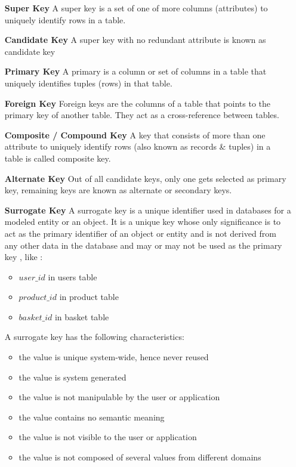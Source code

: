 \documentclass[10pt]{article}
\begin{document}
\begin{itemize}
	\item [\textbf{Super Key}] A super key is a set of one of more columns (attributes) to uniquely identify rows in a table.
	\item [\textbf{Candidate Key}] A super key with no redundant attribute is known as candidate key
	\item [\textbf{Primary Key}] A primary is a column or set of columns in a table that uniquely identifies tuples (rows) in that table.
	\item [\textbf{Foreign Key}] Foreign keys are the columns of a table that points to the primary key of another table. They act as a cross-reference between tables.
	\item [\textbf{Composite / Compound Key}] A key that consists of more than one attribute to uniquely identify rows (also known as records \& tuples) in a table is called composite key.
	\item [\textbf{Alternate Key}] Out of all candidate keys, only one gets selected as primary key, remaining keys are known as alternate or secondary keys.
	\item [\textbf{Surrogate Key}] A surrogate key is a unique identifier used in databases for a modeled entity or an object. It is a unique key whose only significance is to act as the primary identifier of an object or entity and is not derived from any other data in the database and may or may not be used as the primary key , like :
	\begin{itemize}
		\item $user\_id$ in users table 
		\item $product\_id$ in product table 
		\item $basket\_id$ in basket table
	\end{itemize}
	
	A surrogate key has the following characteristics:
	\begin{itemize}
		\item the value is unique system-wide, hence never reused
		\item the value is system generated
		\item the value is not manipulable by the user or application
		\item the value contains no semantic meaning
		\item the value is not visible to the user or application
		\item the value is not composed of several values from different domains
	\end{itemize}
\end{itemize}
\end{document}
